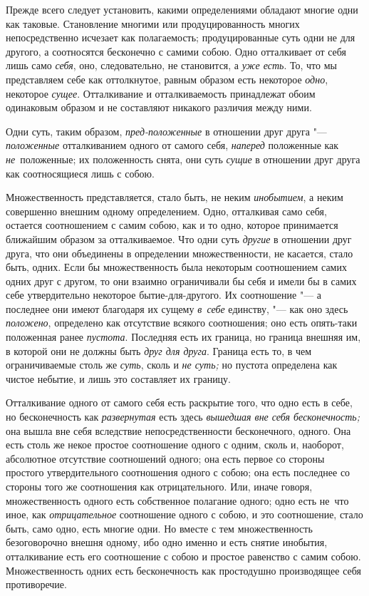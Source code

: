 Прежде всего следует установить, какими определениями обладают многие одни
как таковые. Становление многими или продуцированность многих
непосредственно исчезает как полагаемость; продуцированные суть одни не для
другого, а соотносятся бесконечно с самими собою. Одно отталкивает от себя
лишь само {\em себя}, оно, следовательно, не
становится, а {\em уже есть}. То, что мы представляем
себе как оттолкнутое, равным образом есть некоторое
{\em одно}, некоторое {\em сущее}.
Отталкивание и отталкиваемость принадлежат обоим одинаковым образом и не
составляют никакого различия между ними.

Одни суть, таким образом, {\em пред-положенные} в
отношении друг друга "--- {\em положенные} отталкиванием
одного от самого себя, {\em наперед} положенные как
{\em не}~положенные; их положенность снята, они суть
{\em сущие} в отношении друг друга как соотносящиеся лишь с собою.

Множественность представляется, стало быть, не неким
{\em инобытием}, а неким совершенно внешним одному
определением. Одно, отталкивая само себя, остается соотношением с самим
собою, как и то одно, которое принимается ближайшим образом за
отталкиваемое. Что одни суть {\em другие} в отношении
друг друга, что они объединены в определении множественности, не касается,
стало быть, одних. Если бы множественность была некоторым соотношением
самих одних друг с другом, то они взаимно ограничивали бы себя и имели бы в
самих себе утвердительно некоторое бытие-для-другого. Их соотношение "--- а
последнее они имеют благодаря их сущему {\em в~себе}
единству, "--- как оно здесь {\em положено}, определено
как отсутствие всякого соотношения; оно есть опять-таки положенная ранее
{\em пустота}. Последняя есть их граница, но граница
внешняя им, в которой они не должны быть {\em друг для
друга}. Граница есть то, в чем ограничиваемые столь же
{\em суть}, сколь и {\em не суть;}
но пустота определена как чистое небытие, и лишь это составляет их границу.

Отталкивание одного от самого себя есть раскрытие того, что одно есть в
себе, но бесконечность как {\em развернутая} есть здесь
{\em вышедшая вне себя бесконечность;} она вышла вне
себя вследствие непосредственности бесконечного, одного. Она есть столь же
некое простое соотношение одного с одним, сколь и, наоборот, абсолютное
отсутствие соотношений одного; она есть первое со стороны простого
утвердительного соотношения одного с собою; она есть последнее со стороны
того же соотношения как отрицательного. Или, иначе говоря, множественность
одного есть собственное полагание одного; одно есть не~что иное, как
{\em отрицательное} соотношение одного с собою, и это
соотношение, стало быть, само одно, есть многие одни. Но вместе с тем
множественность безоговорочно внешня одному, ибо одно именно и есть снятие
инобытия, отталкивание есть его соотношение с собою и простое равенство с
самим собою. Множественность одних есть бесконечность как простодушно
производящее себя противоречие.

